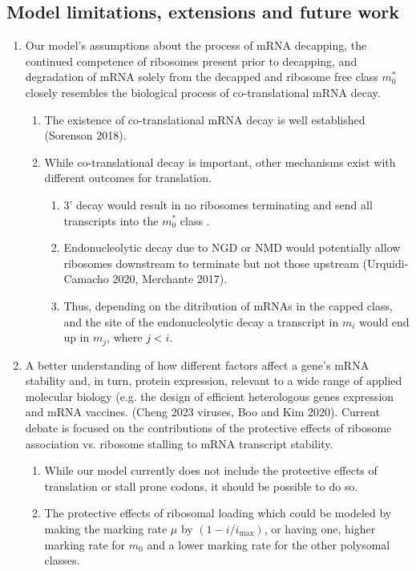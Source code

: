 \documentclass[review]{elsarticle}
\newcommand{\imax}{\ensuremath{{i_{\max}}}\xspace}
\begin{document}
\subsection{Model limitations, extensions and future work}
\begin{enumerate}
\item Our model's assumptions about the process of mRNA decapping, the continued competence of ribosomes present prior to decapping, and degradation of mRNA solely from the decapped and ribosome free class $m_0^*$  closely resembles the biological process of co-translational mRNA decay.
  \begin{enumerate}
  \item   The existence of co-translational mRNA decay is well established (Sorenson 2018).
  \item While co-translational decay is important, other mechanisms exist with different outcomes for translation. 
    \begin{enumerate}
    \item 3' decay would result in no ribosomes terminating and send all transcripts into the $m_0^*$ class . 
    \item Endonucleolytic decay due to NGD or NMD would potentially allow ribosomes downstream to terminate but not those upstream (Urquidi-Camacho 2020, Merchante 2017).
    \item Thus, depending on the ditribution of mRNAs in the capped class, and the site of the endonucleolytic decay a transcript in $m_i$ would end up in $m_{j}$, where $j < i$.		
    \end{enumerate}
  \end{enumerate}
\item  A better understanding of how different factors affect a gene's mRNA stability and, in turn, protein expression, relevant to a wide range of applied molecular biology (e.g. the design of efficient heterologous genes expression and mRNA vaccines. (Cheng 2023 viruses, Boo and Kim 2020).
  Current debate is focused on the contributions of the protective effects of ribosome association vs. ribosome stalling to mRNA transcript stability.
  \begin{enumerate}
  \item While our model currently does not include the protective effects of translation or stall prone codons, it should be possible to do so.
  \item The protective effects of ribosomal loading which could be modeled by making the marking rate $\mu $ by $(1-i/\imax)$, or having one, higher marking rate for $m_0$ and a lower marking rate for the other polysomal classes.

\end{enumerate}
\end{enumerate}
\end{document}
